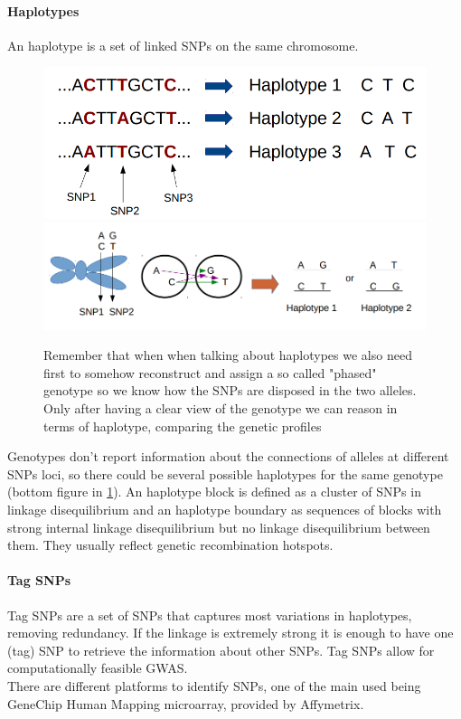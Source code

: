 			\paragraph{Haplotypes}
			An haplotype is a set of linked SNPs on the same chromosome.
			
			\begin{figure}[H]
				\centering
				\includegraphics[scale=0.3]{haplo}
				\includegraphics[scale=0.3]{haplo2}
				\caption{Remember that when when talking about haplotypes we also need first to somehow reconstruct and assign a so called "phased" genotype so we know how the SNPs are disposed in the two alleles. Only after having a clear view of the genotype we can reason in terms of haplotype, comparing the genetic profiles  }
				\label{fig:haplo}
				\end{figure}
				
			Genotypes don't report information about the connections of alleles at different SNPs loci, so there could be several possible haplotypes for the same genotype (bottom figure in \ref{fig:haplo}).
			An haplotype block is defined as a cluster of SNPs in linkage disequilibrium and an haplotype boundary as sequences of blocks with strong internal linkage disequilibrium but no linkage disequilibrium between them.
			They usually reflect genetic recombination hotspots.

			\paragraph{Tag SNPs}
			Tag SNPs are a set of SNPs that captures most variations in haplotypes, removing redundancy.
			If the linkage is extremely strong it is enough to have one (tag) SNP to retrieve the information about other SNPs.
			Tag SNPs allow for computationally feasible GWAS.
			\\
			There are different platforms to identify SNPs, one of the main used being GeneChip Human Mapping microarray, provided by Affymetrix. 

